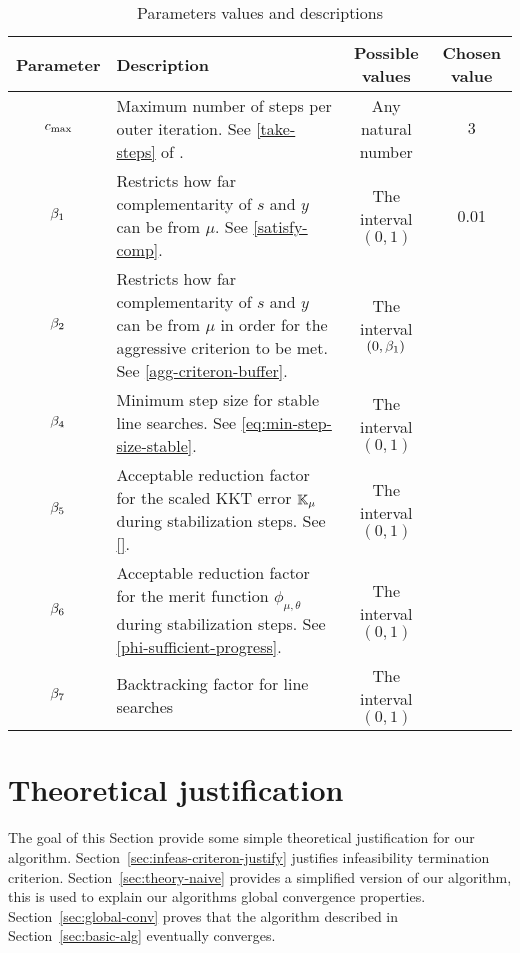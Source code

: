 \documentclass{article}
\begin{document}
\begin{table}[H]
\begin{tabular}{ |c| p{7cm}|c|c| } 
 \hline
Parameter & Description & Possible values & Chosen value  \\ 
 \hline
$c_{\max}$ & Maximum number of steps per outer iteration. See \eqref{take-steps} of .  & Any natural number & $3$  \\ 
 \hline
  $\beta_{1}$ & Restricts how far complementarity of $s$ and $y$ can be from $\mu$. See \eqref{satisfy-comp}.  & The interval $(0,1)$ & 0.01 \\ 
 \hline
   $\beta_{2}$ & Restricts how far complementarity of $s$ and $y$ can be from $\mu$ in order for the aggressive criterion to be met. See \eqref{agg-criteron-buffer}.  & The interval  $(0, \beta_{1})$ &  \\ 
    \hline
   $\beta_{4}$ & Minimum step size for stable line searches. See \eqref{eq:min-step-size-stable}.  & The interval $(0,1)$ &  \\ 
   \hline
      $\beta_{5}$ & Acceptable reduction factor for the scaled KKT error $\mathbb{K}_{\mu}$ during stabilization steps. See \eqref{}.  & The interval $(0,1)$ &  \\ 
      \hline
            $\beta_{6}$ & Acceptable reduction factor for the merit function $\phi_{\mu,\theta}$ during stabilization steps. See \eqref{phi-sufficient-progress}.  & The interval $(0,1)$ &  \\
        \hline
$\beta_{7}$ & Backtracking factor for line searches & The interval $(0,1)$ & \\
\hline
\end{tabular}
\caption{Parameters values and descriptions}
\end{table}


\section{Theoretical justification}\label{sec:theory}

The goal of this Section provide some simple theoretical justification for our algorithm. Section~\ref{sec:infeas-criteron-justify} justifies infeasibility termination criterion. Section~\ref{sec:theory-naive} provides a simplified version of our algorithm, this is used to explain our algorithms global convergence properties. Section~\ref{sec:global-conv} proves that the algorithm described in Section~\ref{sec:basic-alg} eventually converges. 
\end{document}
